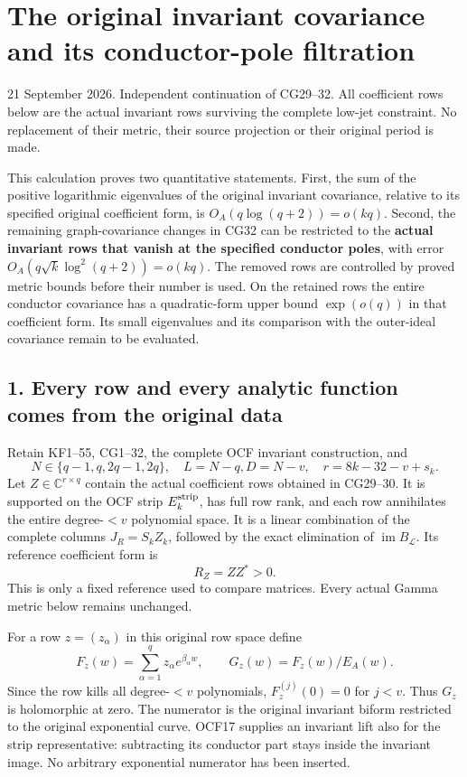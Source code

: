 \section{The original invariant covariance and its conductor-pole filtration}\label{the-original-invariant-covariance-and-its-conductor-pole-filtration}

21 September 2026. Independent continuation of CG29--32. All coefficient rows below are the actual invariant rows surviving the complete low-jet constraint. No replacement of their metric, their source projection or their original period is made.

This calculation proves two quantitative statements. First, the sum of the positive logarithmic eigenvalues of the original invariant covariance, relative to its specified original coefficient form, is \(O_A(q\log(q+2))=o(kq)\). Second, the remaining graph-covariance changes in CG32 can be restricted to the \textbf{actual invariant rows that vanish at the specified conductor poles}, with error \(O_A(q\sqrt{k}\log^2(q+2))=o(kq)\). The removed rows are controlled by proved metric bounds before their number is used. On the retained rows the entire conductor covariance has a quadratic-form upper bound \(\exp(o(q))\) in that coefficient form. Its small eigenvalues and its comparison with the outer-ideal covariance remain to be evaluated.

\subsection{1. Every row and every analytic function comes from the original data}\label{every-row-and-every-analytic-function-comes-from-the-original-data}

Retain KF1--55, CG1--32, the complete OCF invariant construction, and \[
N\in\{q-1,q,2q-1,2q\},\quad L=N-q,
D=N-v,\quad r=8k-32-v+s_k.
\tag{CGR1}
\] Let \(Z\in\mathbb C^{r\times q}\) contain the actual coefficient rows obtained in CG29--30. It is supported on the OCF strip \(E_k^{\rm strip}\), has full row rank, and each row annihilates the entire degree-\(<v\) polynomial space. It is a linear combination of the complete columns \(J_R=S_kZ_k\), followed by the exact elimination of \(\operatorname{im}B_{\mathcal L}\). Its reference coefficient form is \[
R_Z=ZZ^*>0.
\tag{CGR2}
\] This is only a fixed reference used to compare matrices. Every actual Gamma metric below remains unchanged.

For a row \(z=(z_\alpha)\) in this original row space define \[
F_z(w)=\sum_{\alpha=1}^qz_\alpha e^{\beta_\alpha w},\qquad
G_z(w)=F_z(w)/E_A(w).
\tag{CGR3}
\] Since the row kills all degree-\(<v\) polynomials, \(F_z^{(j)}(0)=0\) for \(j<v\). Thus \(G_z\) is holomorphic at zero. The numerator is the original invariant biform restricted to the original exponential curve. OCF17 supplies an invariant lift also for the strip representative: subtracting its conductor part stays inside the invariant image. No arbitrary exponential numerator has been inserted.

